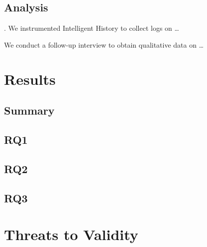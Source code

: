 \subsection{Analysis}

. We instrumented Intelligent History to collect logs on \dots

 We conduct a follow-up interview to obtain qualitative data on \dots

\section{Results}
\label{sec:Results}

\subsection{Summary}


\subsection{RQ1}

\subsection{RQ2}

\subsection{RQ3}

\section{Threats to Validity}
\label{sec:Threads-to-Validity}


\endinput

Any text after an \endinput is ignored.
You could put scraps here or things in progress.